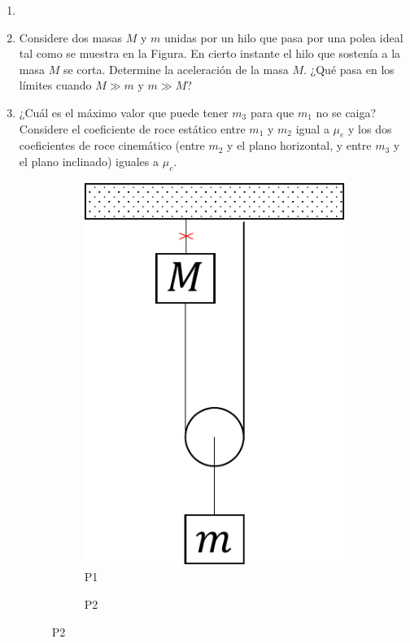\documentclass[letterpaper,11pt]{article}
\begin{document}
\vspace{-1cm}
\begin{enumerate}\setlength{\itemsep}{0.4cm}

\item[]

\item Considere dos masas $M$ y $m$ unidas por un hilo que pasa por una polea ideal tal como se muestra en la Figura.
En cierto instante el hilo que sostenía a la masa $M$ se corta. Determine la aceleración de la masa $M$.
¿Qué pasa en los límites cuando $M \gg m$ y $m\gg M$?

\item ¿Cuál es el máximo valor que puede tener $m_3$ para que $m_1$ no se caiga? Considere el coeficiente de roce estático entre $m_1$ y $m_2$ igual a $\mu_e$ y los dos coeficientes de roce cinemático (entre $m_2$ y el plano horizontal, y entre $m_3$ y el plano inclinado) iguales a $\mu_c$.

\begin{figure}[h!]
    \centering
    \begin{subfigure}[t]{0.35\textwidth}
        \centering
        \includegraphics[width=0.6\linewidth]{2021-1/Imagenes/aux6/p3.pdf}
        \caption{P1}
    \end{subfigure}
    \begin{subfigure}[t]{0.4\textwidth}
        \centering
        
        \caption{P2}
    \end{subfigure}
\end{figure}



\end{enumerate}
\end{document}
